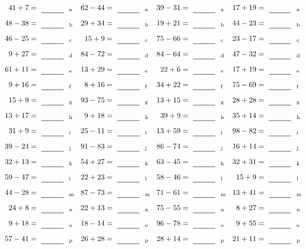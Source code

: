 \documentclass
[
  draft    = true,
  fontsize = 11pt,
  parskip  = half-
]
{scrartcl}
\begin{document}
\clearpage
\begin{align*}
    \pline{41+7}&=\rline{a}
  & \pline{62-44}&=\rline{a}
  & \pline{39-31}&=\rline{a}
  & \pline{17+19}&=\rline{a} \\[1ex]
    \pline{48-38}&=\rline{b}
  & \pline{29+34}&=\rline{b}
  & \pline{19+21}&=\rline{b}
  & \pline{44-23}&=\rline{b} \\[1ex]
    \pline{46-25}&=\rline{c}
  & \pline{15+9}&=\rline{c}
  & \pline{75-66}&=\rline{c}
  & \pline{23-17}&=\rline{c} \\[1ex]
    \pline{9+27}&=\rline{d}
  & \pline{84-72}&=\rline{d}
  & \pline{84-64}&=\rline{d}
  & \pline{47-32}&=\rline{d} \\[1ex]
    \pline{61+11}&=\rline{e}
  & \pline{13+29}&=\rline{e}
  & \pline{22+6}&=\rline{e}
  & \pline{17+19}&=\rline{e} \\[1ex]
    \pline{9+16}&=\rline{f}
  & \pline{8+16}&=\rline{f}
  & \pline{34+22}&=\rline{f}
  & \pline{75-69}&=\rline{f} \\[1ex]
    \pline{15+9}&=\rline{g}
  & \pline{93-75}&=\rline{g}
  & \pline{13+15}&=\rline{g}
  & \pline{28+28}&=\rline{g} \\[1ex]
    \pline{13+17}&=\rline{h}
  & \pline{9+18}&=\rline{h}
  & \pline{39+9}&=\rline{h}
  & \pline{35+14}&=\rline{h} \\[1ex]
    \pline{31+9}&=\rline{i}
  & \pline{25-11}&=\rline{i}
  & \pline{13+59}&=\rline{i}
  & \pline{98-82}&=\rline{i} \\[1ex]
    \pline{39-24}&=\rline{j}
  & \pline{91-83}&=\rline{j}
  & \pline{86-74}&=\rline{j}
  & \pline{16+14}&=\rline{j} \\[1ex]
    \pline{32+13}&=\rline{k}
  & \pline{54+27}&=\rline{k}
  & \pline{63-45}&=\rline{k}
  & \pline{32+31}&=\rline{k} \\[1ex]
    \pline{59-47}&=\rline{l}
  & \pline{22+23}&=\rline{l}
  & \pline{58-46}&=\rline{l}
  & \pline{15+9}&=\rline{l} \\[1ex]
    \pline{44-28}&=\rline{m}
  & \pline{87-73}&=\rline{m}
  & \pline{71-61}&=\rline{m}
  & \pline{13+41}&=\rline{m} \\[1ex]
    \pline{24+8}&=\rline{n}
  & \pline{22+13}&=\rline{n}
  & \pline{75-55}&=\rline{n}
  & \pline{8+27}&=\rline{n} \\[1ex]
    \pline{9+18}&=\rline{o}
  & \pline{18-14}&=\rline{o}
  & \pline{96-78}&=\rline{o}
  & \pline{9+55}&=\rline{o} \\[1ex]
    \pline{57-41}&=\rline{p}
  & \pline{26+28}&=\rline{p}
  & \pline{28+14}&=\rline{p}
  & \pline{21+11}&=\rline{p}
\end{align*}
\end{document}

